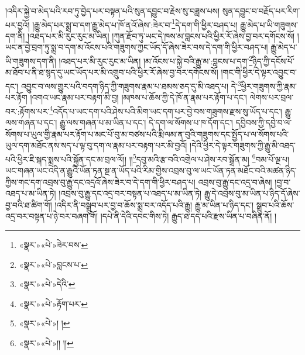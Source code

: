 །འདིར་སྐྱེ་བ་མེད་པའི་རབ་ཏུ་བྱེད་པར་བསྟན་པའི་སུན་དབྱུང་བ་རྗེས་སུ་བཟླས་པས། སུན་དབྱུང་བ་བརྗོད་པར་རིག་པར་བྱའོ། །རྒྱུ་མེད་པར་སྨྲ་བ་དག་རྒྱུ་མེད་པ་ཁོ་ནའོ་ཞེས་:ཟེར་བ་\footnote{«སྣར་»«པེ་»ཟེར་བས་}དེ་དག་གི་ཕྱིར་བཤད་པ། རྒྱུ་མེད་པ་ཡི་གཟུགས་དག་ནི། །འཐད་པར་མི་རུང་རུང་མ་ཡིན། །ཀུན་རྫོབ་ཏུ་ཡང་དེ་ཁས་མ་བླངས་པའི་ཕྱིར་རོ་ཞེས་བྱ་བར་དགོངས་སོ། །ཡང་ན་བྱེ་བྲག་ཏུ་སྨྲ་བ་དག་མ་འོངས་པའི་གཟུགས་ཀྱང་ཡོད་དོ་ཞེས་ཟེར་བས་དེ་དག་གི་ཕྱིར་བཤད་པ། རྒྱུ་མེད་པ་ཡི་གཟུགས་དག་ནི། །འཐད་པར་མི་རུང་རུང་མ་ཡིན། །མ་འོངས་པ་སྐྱེ་བའི་རྒྱུ་མ་:བླངས་པ་དག་\footnote{«སྣར་»«པེ་»བླངས་པ་}ཉིད་ཀྱི་དངོས་པོ་མ་ཐོབ་པ་ནི་ཐ་སྙད་དུ་ཡང་ཡོད་པར་མི་འགྲུབ་པའི་ཕྱིར་རོ་ཞེས་བྱ་བར་དགོངས་སོ། །གང་གི་ཕྱིར་དེ་ལྟར་འབྱུང་བ་དང་། འབྱུང་བ་ལས་གྱུར་པའི་བདག་ཉིད་ཀྱི་གཟུགས་རྣམ་པ་ཐམས་ཅད་དུ་མི་འཐད་པ། དེ་\footnote{«སྣར་»«པེ་»དེའི་}ཕྱིར་གཟུགས་ཀྱི་རྣམ་པར་རྟོག །འགའ་ཡང་རྣམ་པར་བརྟག་མི་བྱ། །མཁས་པ་ཆོས་ཀྱི་དེ་ཁོ་ན་རྣམ་པར་རྟོག་པ་དང་། ལེགས་པར་བྲལ་བར་:རྟོགས་པར་\footnote{«སྣར་»«པེ་»རྟོག་པར་}འདོད་པ་ཡང་དག་པའི་ཤེས་པའི་མིག་ཡང་དག་པར་བྱེ་བས་གཟུགས་རྫས་སུ་ཡོད་པ་དང་། རྒྱུ་ལས་གཞན་པ་དང་། རྒྱུ་ལས་གཞན་པ་མ་ཡིན་པ་དང་། དེ་དག་ལ་སོགས་པ་ཁ་དོག་དང་། དབྱིབས་ཀྱི་དབྱེ་བ་ལ་སོགས་པ་ཡུལ་གྱི་རྣམ་པར་རྟོག་པ་མང་པོ་བུ་མ་བཙས་པའི་རྨི་ལམ་ན་བུའི་གཟུགས་དང་སྤྱོད་པ་ལ་སོགས་པའི་ཡུལ་དག་མཐོང་ནས་སད་པ་ལྟ་བུ་དག་ལ་རྣམ་པར་བརྟག་པར་མི་བྱའོ། །དེའི་ཕྱིར་དེ་ལྟར་གཟུགས་ཀྱི་རྒྱུ་མི་འཐད་པའི་ཕྱིར་ཇི་སྐད་སྨྲས་པའི་སྐྱོན་དང་མ་བྲལ་ལོ།། །།\footnote{«སྣར་»«པེ་»། །}དབུ་མའི་རྩ་བའི་འགྲེལ་པ་ཤེས་རབ་སྒྲོན་མ། \footnote{«སྣར་»«པེ་»།། །།}བམ་པོ་ལྔ་པ། ཡང་གཞན་ཡང་འདི་ན་རྒྱུའི་ཡོན་ཏན་སྔ་ན་ཡོད་པའི་རིམ་གྱིས་འབྲས་བུ་ལ་ཡང་ཡོན་ཏན་མཐོང་བའི་མཚན་ཉིད་ཀྱིས་གང་དག་འབྲས་བུ་རྒྱུ་དང་འདྲའོ་ཞེས་ཟེར་བ་དེ་དག་གི་ཕྱིར་བཤད་པ། འབྲས་བུ་རྒྱུ་དང་འདྲ་བ་ཞེས། །བྱ་བ་འཐད་པ་མ་ཡིན་ཏེ། །འབྲས་བུ་རྒྱུ་དང་འདྲ་བར་བསྟན་པ་འཐད་པ་མ་ཡིན་ཏེ། རྒྱུ་དེ་འབྲས་བུ་མ་ཡིན་པ་ཉིད་དོ་ཞེས་བྱ་བའི་ཐ་ཚིག་གོ། །འདིར་ནི་བསྒྲུབ་པར་བྱ་བ་ཆོས་སྨྲ་བར་འདོད་པའི་རྒྱུ། རྒྱུ་མ་ཡིན་པ་ཉིད་དང་། སྒྲུབ་པའི་ཆོས་འདྲ་བར་བསྟན་པ་ཉེ་བར་བཞག་གོ། །དཔེ་ནི་དེའི་དབང་གིས་ཏེ། རྒྱུད་ཐ་དད་པའི་རྫས་ཡིན་པ་བཞིན་ནོ། །
